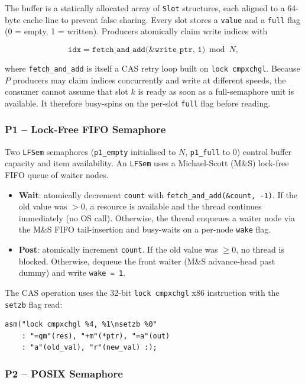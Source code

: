\documentclass{article}
\begin{document}
The buffer is a statically allocated array of \texttt{Slot} structures,
each aligned to a 64-byte cache line to prevent false sharing. Every slot
stores a \texttt{value} and a \texttt{full} flag (0 = empty, 1 = written).
Producers atomically claim write indices with

\[
\texttt{idx} = \texttt{fetch\_and\_add(\&write\_ptr, 1)} \bmod N,
\]

where \texttt{fetch\_and\_add} is itself a CAS retry loop built on
\texttt{lock cmpxchgl}. Because $P$ producers may claim indices
concurrently and write at different speeds, the consumer cannot assume
that slot $k$ is ready as soon as a full-semaphore unit is available.
It therefore busy-spins on the per-slot \texttt{full} flag before reading.

\subsubsection{P1 -- Lock-Free FIFO Semaphore}

Two \texttt{LFSem} semaphores (\texttt{p1\_empty} initialised to $N$,
\texttt{p1\_full} to 0) control buffer capacity and item availability.
An \texttt{LFSem} uses a Michael-Scott (M\&S) lock-free FIFO queue of waiter nodes.

\begin{itemize}
    \item \textbf{Wait}: atomically decrement \texttt{count} with
    \texttt{fetch\_and\_add(\&count, -1)}. If the old value was $> 0$,
    a resource is available and the thread continues immediately (no OS call).
    Otherwise, the thread enqueues a waiter node via the M\&S FIFO tail-insertion
    and busy-waits on a per-node \texttt{wake} flag.
    \item \textbf{Post}: atomically increment \texttt{count}. If the old value
    was $\geq 0$, no thread is blocked. Otherwise, dequeue the front waiter
    (M\&S advance-head past dummy) and write \texttt{wake = 1}.
\end{itemize}

The CAS operation uses the 32-bit \texttt{lock cmpxchgl} x86 instruction with the \texttt{setzb} flag read:

\begin{verbatim}
asm("lock cmpxchgl %4, %1\nsetzb %0"
    : "=qm"(res), "+m"(*ptr), "=a"(out)
    : "a"(old_val), "r"(new_val) :);
\end{verbatim}

\subsubsection{P2 -- POSIX Semaphore}
\end{document}
